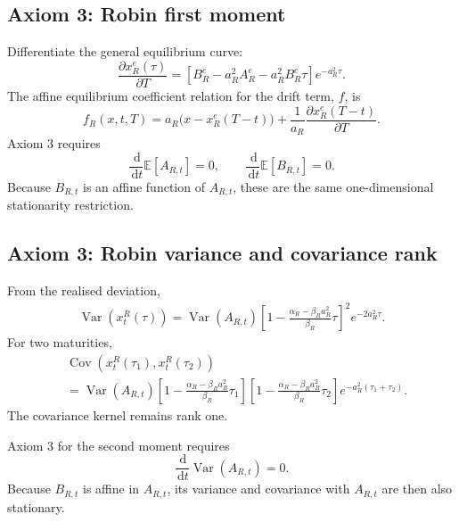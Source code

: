 \documentclass[12pt]{article}
\numberwithin{equation}{subsection}
\newcommand{\E}{\mathbb{E}}
\newcommand{\Var}{\operatorname{Var}}
\newcommand{\Cov}{\operatorname{Cov}}
\newcommand{\dd}{\,\mathrm{d}}
\begin{document}
\subsection{Axiom 3: Robin first moment}

Differentiate the general equilibrium curve:
\begin{equation}
\frac{\partial x_R^e(\tau)}{\partial T}
=
\left[
B_R^e-a_R^2A_R^e-a_R^2B_R^e\tau
\right]e^{-a_R^2\tau}.
\end{equation}
The affine equilibrium coefficient relation for the drift term, $f$, is
\begin{equation}
f_R(x,t,T)
=
a_R\bigl(x-x_R^e(T-t)\bigr)
+
\frac{1}{a_R}\frac{\partial x_R^e(T-t)}{\partial T}.
\end{equation}
Axiom 3 requires
\begin{equation}
\frac{\dd}{\dd t}\E[A_{R,t}]=0,
\qquad
\frac{\dd}{\dd t}\E[B_{R,t}]=0.
\end{equation}
Because $B_{R,t}$ is an affine function of $A_{R,t}$, these are the same one-dimensional stationarity restriction.

\subsection{Axiom 3: Robin variance and covariance rank}

From the realised deviation,
\begin{equation}
\begin{aligned}
\Var\!\left(x^R_t(\tau)\right)
=
\Var(A_{R,t})
\left[
1-
\frac{\alpha_R-\beta_Ra_R^2}{\beta_R}\tau
\right]^2e^{-2a_R^2\tau}.
\end{aligned}
\end{equation}
For two maturities,
\begin{equation}
\begin{aligned}
&\Cov\!\left(x^R_t(\tau_1),x^R_t(\tau_2)\right)
\\
&=\Var(A_{R,t})
\left[
1-
\frac{\alpha_R-\beta_Ra_R^2}{\beta_R}\tau_1
\right]
\left[
1-
\frac{\alpha_R-\beta_Ra_R^2}{\beta_R}\tau_2
\right]
 e^{-a_R^2(\tau_1+\tau_2)}.
\end{aligned}
\end{equation}
The covariance kernel remains rank one.

Axiom 3 for the second moment requires
\begin{equation}
\frac{\dd}{\dd t}\Var(A_{R,t})=0.
\end{equation}
Because $B_{R,t}$ is affine in $A_{R,t}$, its variance and covariance with $A_{R,t}$ are then also stationary.
\end{document}

